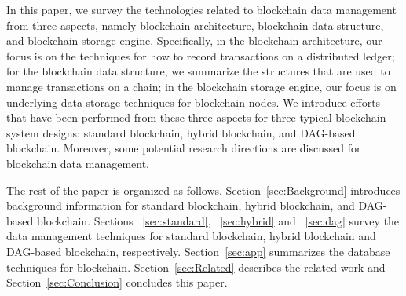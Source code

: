 \documentclass[acmsmall]{acmart}
\begin{document}
In this paper, we survey the technologies related to blockchain data management from three aspects, namely blockchain architecture, blockchain data structure, and blockchain storage engine. 
Specifically, in the blockchain architecture, our focus is on the techniques for how to record transactions on a distributed ledger; for the blockchain data structure, we summarize the structures that are used to manage transactions on a chain; in the blockchain storage engine,  our focus is on underlying data storage techniques for blockchain nodes. We introduce efforts that have been performed from these three aspects for three typical blockchain system designs: standard blockchain, hybrid blockchain, and DAG-based blockchain. Moreover, 
some potential research directions are discussed for blockchain data management.


The rest of the paper is organized as follows. Section~\ref{sec:Background} introduces background information for standard blockchain, hybrid blockchain, and DAG-based blockchain.
Sections ~\ref{sec:standard}, ~\ref{sec:hybrid} and ~\ref{sec:dag} survey the data management techniques for standard blockchain, hybrid blockchain and DAG-based blockchain, respectively.
Section~\ref{sec:app} summarizes the database techniques for blockchain. Section~\ref{sec:Related} describes the related work and Section~\ref{sec:Conclusion} concludes this paper.
\end{document}
